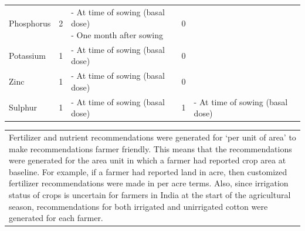 \documentclass{article}
\begin{document}
\begin{table}[!htb]
\begin{tabularx}{\linewidth}{llX|lX}
Phosphorus & 2 & \makecell[l]{- At time of sowing (basal dose) \\ - One month after sowing} & 0 & \\
Potassium & 1 & - At time of sowing (basal dose) & 0 & \\
Zinc & 1 & - At time of sowing (basal dose) & 0 & \\
Sulphur & 1 & - At time of sowing (basal dose) & 1 & - At time of sowing (basal dose)
\end{tabularx}
\begin{tabularx}{\linewidth}{X}
\hline 
Fertilizer and nutrient recommendations were generated for ‘per unit of area’ to make recommendations farmer friendly. This means that the recommendations were generated for the area unit  in which a farmer had reported crop area at baseline. For example, if a farmer had reported land in acre, then customized fertilizer recommendations were made in per acre terms. Also, since irrigation status of crops is uncertain for farmers in India at the start of the agricultural season, recommendations for both irrigated and unirrigated cotton were generated for each farmer.  \\ 
\end{tabularx}
\end{table}

\FloatBarrier

\pagebreak
\clearpage

\FloatBarrier
\end{document}

